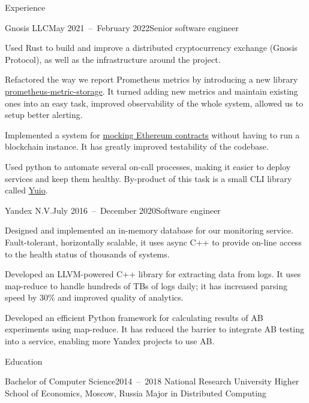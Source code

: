 \documentclass{resume}
\begin{document}
    \begin{rSection}{Experience}
        \begin{rSubsection}{Gnosis LLC}{May 2021~--~February 2022}{Senior software engineer}{}
            \item
                Used Rust to build and improve
                a distributed cryptocurrency exchange (Gnosis Protocol),
                as well as the infrastructure around the project.
            \item
                Refactored the way we report Prometheus metrics
                by introducing a new library
                \href{https://github.com/taminomara/prometheus-metric-storage}{prometheus-metric-storage}.
                It turned adding new metrics
                and maintain existing ones into an easy task,
                improved observability of the whole system,
                allowed us to setup better alerting.
            \item
                Implemented a system for
                \href{https://docs.rs/ethcontract-mock/latest/ethcontract_mock/}{mocking Ethereum contracts}
                without having to run a blockchain instance.
                It has greatly improved testability of the codebase.
            \item
                Used python to automate several on-call processes,
                making it easier to deploy services and keep them healthy.
                By-product of this task is a small CLI library called
                \href{https://github.com/taminomara/yuio}{Yuio}.
        \end{rSubsection}

        \begin{rSubsection}{Yandex N.V.}{July 2016~--~December 2020}{Software engineer}{}
            \item
                Designed and implemented an in-memory database
                for our monitoring service.
                Fault-tolerant, horizontally scalable,
                it uses async C++ to provide on-line access
                to the health status of thousands of systems.
            \item
                Developed an LLVM-powered C++ library
                for extracting data from logs.
                It uses map-reduce to handle hundreds of TBs of logs daily;
                it has increased parsing speed
                by 30\% and improved quality of analytics.
            \item
                Developed an efficient Python framework
                for calculating results of AB experiments using map-reduce.
                It has reduced the barrier
                to integrate AB testing into a service,
                enabling more Yandex projects to use AB\@.
        \end{rSubsection}
    \end{rSection}

    \begin{rSection}{Education}
        \begin{rSubsection}{Bachelor of Computer Science}{2014~--~2018}
        {National Research University Higher School of Economics, Moscow, Russia}{}
            Major in Distributed Computing
        \end{rSubsection}
    \end{rSection}
\end{document}
